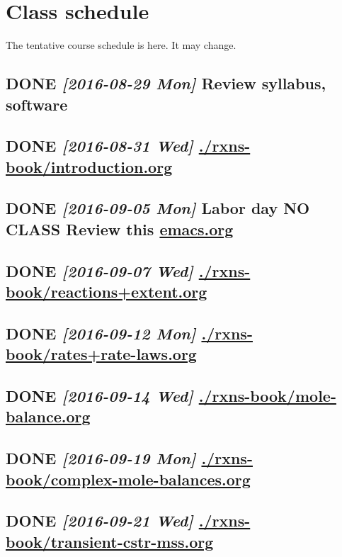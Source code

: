 \documentclass[11pt]{article}
\begin{document}
\section{Class schedule}
\label{schedule}
The tentative course schedule is here. It may change.
\subsection{{\bfseries\sffamily DONE} \textit{[2016-08-29 Mon] } Review syllabus, software}
\label{sec:orgheadline17}

\subsection{{\bfseries\sffamily DONE} \textit{[2016-08-31 Wed] } \url{./rxns-book/introduction.org}}
\label{sec:orgheadline18}

\subsection{{\bfseries\sffamily DONE} \textit{[2016-09-05 Mon] } Labor day \textbf{NO CLASS}  Review this \url{emacs.org}}
\label{sec:orgheadline19}

\subsection{{\bfseries\sffamily DONE} \textit{[2016-09-07 Wed] } \url{./rxns-book/reactions+extent.org}}
\label{sec:orgheadline20}

\subsection{{\bfseries\sffamily DONE} \textit{[2016-09-12 Mon] } \url{./rxns-book/rates+rate-laws.org}}
\label{sec:orgheadline21}

\subsection{{\bfseries\sffamily DONE} \textit{[2016-09-14 Wed] } \url{./rxns-book/mole-balance.org}}
\label{sec:orgheadline22}

\subsection{{\bfseries\sffamily DONE} \textit{[2016-09-19 Mon] } \url{./rxns-book/complex-mole-balances.org}}
\label{sec:orgheadline23}

\subsection{{\bfseries\sffamily DONE} \textit{[2016-09-21 Wed] } \url{./rxns-book/transient-cstr-mss.org}}
\label{sec:orgheadline24}
\end{document}
